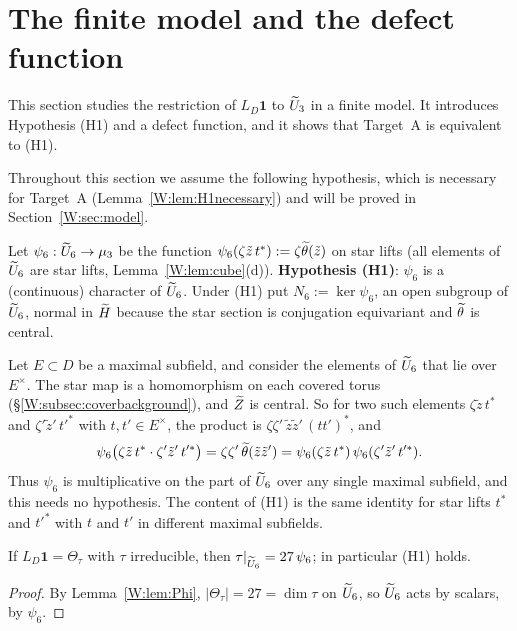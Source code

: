 \section{The finite model and the defect function}\label{W:sec:finite}
This section studies the restriction of $L_D\mathbf1$ to $\widetilde U_3$ in a finite model. It introduces Hypothesis (H1) and a defect function, and it shows that Target~A is equivalent to (H1).

Throughout this section we assume the following hypothesis, which is
necessary for Target~A (Lemma~\ref{W:lem:H1necessary}) and will be
proved in Section~\ref{W:sec:model}.

\begin{definition}[Hypothesis (H1)]\label{W:def:psi6}
Let $\psi_6:\widetilde U_6\to\mu_3$ be the function
$\psi_6(\zeta\tilde z\,t^*):=\zeta\widetilde\theta(\tilde z)$ on star lifts (all
elements of $\widetilde U_6$ are star lifts, Lemma~\ref{W:lem:cube}(d)).
\textbf{Hypothesis (H1)}: $\psi_6$ is a (continuous) character of
$\widetilde U_6$.  Under (H1) put $N_6:=\ker\psi_6$, an open subgroup of
$\widetilde U_6$, normal in $\widetilde H$ because the star section is conjugation
equivariant and $\widetilde\theta$ is central.
\end{definition}

\begin{example}\label{W:ex:H1torus}
Let $E\subset D$ be a maximal subfield, and consider the elements of $\widetilde U_6$ that lie over $E^\times$. The star map is a homomorphism on each covered torus (\S\ref{W:subsec:coverbackground}), and $\widetilde Z$ is central. So for two such elements $\zeta\tilde z\,t^*$ and $\zeta'\tilde z'\,t'^*$ with $t,t'\in E^\times$, the product is $\zeta\zeta'\,\tilde z\tilde z'\,(tt')^*$, and
\[
 \psi_6\bigl(\zeta\tilde z\,t^*\cdot\zeta'\tilde z'\,t'^*\bigr)
 =\zeta\zeta'\,\widetilde\theta(\tilde z\tilde z')
 =\psi_6(\zeta\tilde z\,t^*)\,\psi_6(\zeta'\tilde z'\,t'^*).
\]
Thus $\psi_6$ is multiplicative on the part of $\widetilde U_6$ over any single maximal subfield, and this needs no hypothesis. The content of (H1) is the same identity for star lifts $t^*$ and $t'^*$ with $t$ and $t'$ in different maximal subfields.
\end{example}


\begin{lemma}\label{W:lem:H1necessary}
If $L_D\mathbf1=\Theta_\tau$ with $\tau$ irreducible, then $\tau|_{\widetilde U_6}=27\,\psi_6$;
in particular (H1) holds.
\end{lemma}
\begin{proof}
By Lemma~\ref{W:lem:Phi}, $|\Theta_\tau|=27=\dim\tau$ on $\widetilde U_6$, so $\widetilde U_6$
acts by scalars, by $\psi_6$.
\end{proof}

